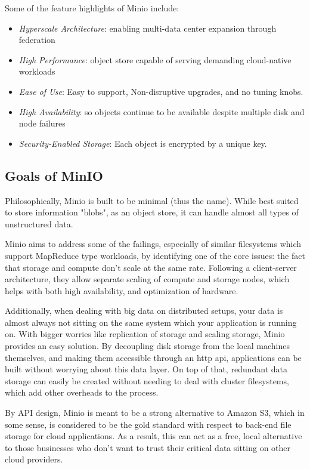 \documentclass{article}
\begin{document}
Some of the feature highlights of Minio include:
\begin{itemize} 
    \item \textit{Hyperscale Architecture}: enabling multi-data center expansion through federation
    \item \textit{High Performance}: object store capable of serving demanding cloud-native workloads
    \item \textit{Ease of Use}: Easy to support, Non-disruptive upgrades, and no tuning knobs.
    \item \textit{High Availability}: so objects continue to be available despite multiple disk and node failures
    \item \textit{Security-Enabled Storage}: Each object is encrypted by a unique key.
\end{itemize}

\subsection{Goals of MinIO}
Philosophically, Minio is built to be minimal (thus the name). While best suited to store information "blobs", as an object store, it can handle almost all types of unstructured data. 

Minio aims to address some of the failings, especially of similar filesystems which support MapReduce type workloads, by identifying one of the core issues: the fact that storage and compute don't scale at the same rate. Following a client-server architecture, they allow separate scaling of compute and storage nodes, which helps with both high availability, and optimization of hardware.

Additionally, when dealing with big data on distributed setups, your data is almost always not sitting on the same system which your application is running on. With bigger worries like replication of storage and scaling storage, Minio provides an easy solution. By decoupling disk storage from the local machines themselves, and making them accessible through an http api, applications can be built without worrying about this data layer. On top of that, redundant data storage can easily be created without needing to deal with cluster filesystems, which add other overheads to the process.

By API design, Minio is meant to be a strong alternative to Amazon S3, which in some sense, is considered to be the gold standard with respect to back-end file storage for cloud applications. As a result, this can act as a free, local alternative to those businesses who don't want to trust their critical data sitting on other cloud providers. 
\end{document}
